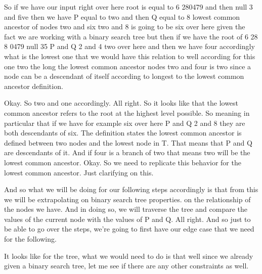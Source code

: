\expandafter\def\csname sourceexcerpt@36\endcsname{%
So if we have our input right over here root is equal to 6 280479 and then null 3 and
five then we have P equal to two and then Q equal to 8 lowest common ancestor of nodes
two and six two and 8 is going to be six over here given the fact we are working with
a binary search tree but then if we have the root of 6 28 8 0479 null 35 P and Q 2 and
4 two over here and then we have four accordingly what is the lowest one that we would
have this relation to well according for this one two the long the lowest common
ancestor nodes two and four is two since a node can be a descendant of itself
according to longest to the lowest common ancestor definition.

Okay. So two and one accordingly. All right. So it looks like that the lowest common
ancestor refers to the root at the highest level possible. So meaning in particular
that if we have for example six over here P and Q 2 and 8 they are both descendants of
six. The definition states the lowest common ancestor is defined between two nodes and
the lowest node in T. That means that P and Q are descendants of it. And if four is a
branch of two that means two will be the lowest common ancestor. Okay. So we need to
replicate this behavior for the lowest common ancestor. Just clarifying on this.

And so what we will be doing for our following steps accordingly is that from this we
will be extrapolating on binary search tree properties. on the relationship of the
nodes we have. And in doing so, we will traverse the tree and compare the values of
the current node with the values of P and Q. All right. And so just to be able to go
over the steps, we're going to first have our edge case that we need for the
following.

It looks like for the tree, what we would need to do is that well since we already
given a binary search tree, let me see if there are any other constraints as well.
}

